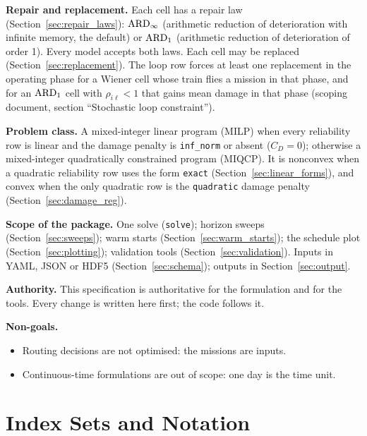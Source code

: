 \textbf{Repair and replacement.} Each cell has a repair law
(Section~\ref{sec:repair_laws}): $\mathrm{ARD}_{\infty}$ (arithmetic reduction of deterioration with
infinite memory, the default) or $\mathrm{ARD}_{1}$ (arithmetic reduction of deterioration of
order 1). Every model accepts both laws. Each cell may be replaced
(Section~\ref{sec:replacement}). The loop row forces at least one replacement in the
operating phase for a Wiener cell whose train flies a mission in that phase, and for
an $\mathrm{ARD}_{1}$ cell with $\rho_{i\ell} < 1$ that gains mean damage in that phase
(scoping document, section ``Stochastic loop constraint'').

\textbf{Problem class.} A mixed-integer linear program (MILP) when every reliability
row is linear and the damage penalty is \texttt{inf\_norm} or absent ($C_D = 0$);
otherwise a mixed-integer quadratically constrained program (MIQCP). It is nonconvex
when a quadratic reliability row uses the form \texttt{exact}
(Section~\ref{sec:linear_forms}), and convex when the only quadratic row is the
\texttt{quadratic} damage penalty (Section~\ref{sec:damage_reg}).

\textbf{Scope of the package.} One solve (\texttt{solve}); horizon sweeps
(Section~\ref{sec:sweeps}); warm starts (Section~\ref{sec:warm_starts}); the schedule
plot (Section~\ref{sec:plotting}); validation tools (Section~\ref{sec:validation}).
Inputs in YAML, JSON or HDF5 (Section~\ref{sec:schema}); outputs in
Section~\ref{sec:output}.

\textbf{Authority.} This specification is authoritative for the formulation and for
the tools. Every change is written here first; the code follows it.

\textbf{Non-goals.}
\begin{itemize}[nosep,leftmargin=1.5em]
  \item Routing decisions are not optimised: the missions are inputs.
  \item Continuous-time formulations are out of scope: one day is the time unit.
\end{itemize}

\section{Index Sets and Notation}
\label{sec:notation}

